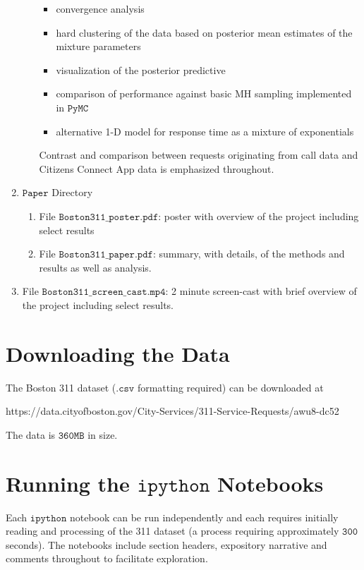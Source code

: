 \documentclass{article}
\theoremstyle{theorem}
\theoremstyle{theorem}
\theoremstyle{theorem}
\theoremstyle{lemma}
\theoremstyle{definition}
\theoremstyle{example}
\begin{document}
\begin{enumerate}
\begin{enumerate}
\begin{itemize}
\item convergence analysis
\item hard clustering of the data based on posterior mean estimates of the mixture parameters
\item visualization of the posterior predictive 
\item comparison of performance against basic MH sampling implemented in $\texttt{PyMC}$
\item alternative 1-D model for response time as a mixture of exponentials
\end{itemize}
Contrast and comparison between requests originating from call data and Citizens Connect App data is emphasized throughout.
\end{enumerate}
\item $\texttt{Paper}$ Directory
\begin{enumerate}
\item File $\texttt{Boston311\_poster.pdf}$: poster with overview of the project including select results
\item File $\texttt{Boston311\_paper.pdf}$: summary, with details, of the methods and results as well as analysis. 
\end{enumerate}
\item File $\texttt{Boston311\_screen\_cast.mp4}$: 2 minute screen-cast with brief overview of the project including select results.
\end{enumerate}

\section{Downloading the Data}
The Boston 311 dataset ($\texttt{.csv}$ formatting required) can be downloaded at
\begin{center}
https://data.cityofboston.gov/City-Services/311-Service-Requests/awu8-dc52
\end{center}
The data is $\mathtt{360MB}$ in size. 
\section{Running the $\texttt{ipython}$ Notebooks}
Each $\texttt{ipython}$ notebook can be run independently and each requires initially reading and processing of the 311 dataset (a process requiring approximately $\mathtt{300}$ seconds). The notebooks include section headers, expository narrative and comments throughout to facilitate exploration. 
\end{document}
